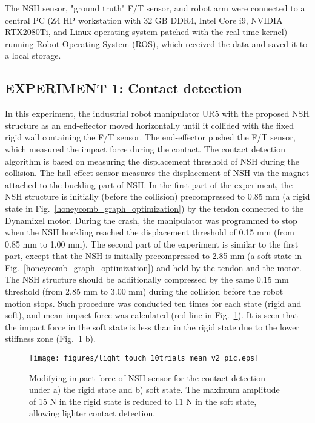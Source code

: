 \documentclass[lettersize,journal]{IEEEtran}
\begin{document}
The NSH sensor, "ground truth" F/T sensor,  and robot arm were connected to a central PC (Z4 HP workstation with 32 GB DDR4, Intel Core i9, NVIDIA RTX2080Ti, and Linux operating system patched with the real-time kernel) running Robot Operating System (ROS), which received the data and saved it to a local storage.

\subsection{EXPERIMENT 1: Contact detection}


In this experiment, the industrial robot manipulator UR5 with the proposed NSH structure as an end-effector moved horizontally until it collided with the fixed rigid wall containing the F/T sensor. The end-effector pushed the F/T sensor, which measured the impact force during the contact. The contact detection algorithm is based on measuring the displacement threshold of NSH during the collision. The hall-effect sensor measures the displacement of NSH via the magnet attached to the buckling part of NSH. In the first part of the experiment, the NSH structure is initially (before the collision) precompressed to 0.85 mm (a rigid state in Fig.~\ref{honeycomb_graph_optimization}) by the tendon connected to the Dynamixel motor. During the crash, the manipulator was programmed to stop when the NSH buckling reached the displacement threshold of 0.15 mm (from 0.85 mm to 1.00 mm). The second part of the experiment is similar to the first part, except that the NSH is initially precompressed to 2.85 mm (a soft state in Fig.~\ref{honeycomb_graph_optimization}) and held by the tendon and the motor. The NSH structure should be additionally compressed by the same 0.15 mm threshold (from 2.85 mm to 3.00 mm) during the collision before the robot motion stops. Such procedure was conducted ten times for each state (rigid and soft), and mean impact force was calculated (red line in Fig.~\ref{light_touch_results}). It is seen that the impact force in the soft state is less than in the rigid state due to the lower stiffness zone (Fig.~\ref{light_touch_results} b).


\begin{figure}[thpb]
\centering
    \texttt{[image: figures/light\_touch\_10trials\_mean\_v2\_pic.eps]}
\caption {Modifying impact force of NSH sensor for the contact detection under a) the rigid state and b) soft state. The maximum amplitude of 15 N in the rigid state is reduced to 11 N in the soft state, allowing lighter contact detection.}
\label{light_touch_results}
\end{figure}
 
\end{document}
